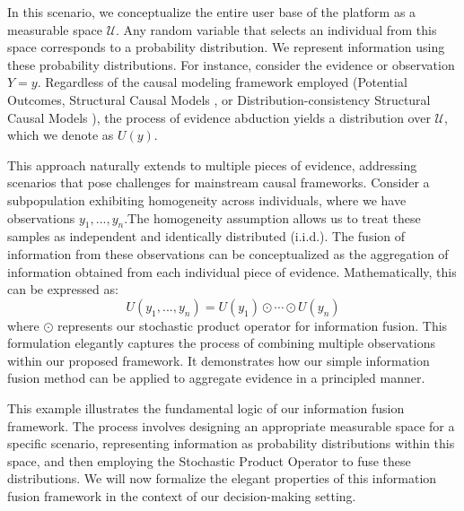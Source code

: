 \documentclass[letterpaper]{article} %
\theoremstyle{definition}
\theoremstyle{remark}
\begin{document}
In this scenario, we conceptualize the entire user base of the platform as a measurable space $\mathcal{U}$. Any random variable that selects an individual from this space corresponds to a probability distribution. We represent information using these probability distributions. For instance, consider the evidence or observation $Y=y$. Regardless of the causal modeling framework employed (Potential Outcomes\cite{rubin1974estimating}, Structural Causal Models \cite{pearl2009causality}, or Distribution-consistency Structural Causal Models \cite{gong2024distribution}), the process of evidence abduction yields a distribution over $\mathcal{U}$, which we denote as $U(y)$.

This approach naturally extends to multiple pieces of evidence, addressing scenarios that pose challenges for mainstream causal frameworks. Consider a subpopulation exhibiting homogeneity across individuals, where we have observations $y_1, ..., y_n$.The homogeneity assumption allows us to treat these samples as independent and identically distributed (i.i.d.). The fusion of information from these observations can be conceptualized as the aggregation of information obtained from each individual piece of evidence. Mathematically, this can be expressed as:
$$U(y_1, ..., y_n) = U(y_1) \odot \cdots \odot U(y_n)$$
where $\odot$ represents our stochastic product operator for information fusion. This formulation elegantly captures the process of combining multiple observations within our proposed framework. It demonstrates how our simple information fusion method can be applied to aggregate evidence in a principled manner. 


This example illustrates the fundamental logic of our information fusion framework. The process involves designing an appropriate measurable space for a specific scenario, representing information as probability distributions within this space, and then employing the Stochastic Product Operator to fuse these distributions. We will now formalize the elegant properties of this information fusion framework in the context of our decision-making setting.
\end{document}
